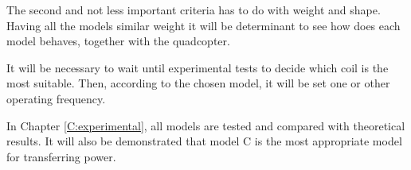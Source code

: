The second and not less important criteria has to do with weight and shape. Having all the models similar weight it will be determinant to see how does each model behaves, together with the quadcopter. 

It will be necessary to wait until experimental tests to decide which coil is the most suitable. Then, according to the chosen model, it will be set one or other operating frequency.

In Chapter \ref{C:experimental}, all models are tested and compared with theoretical results. It will also be demonstrated that model C is the most appropriate model for transferring power. 









 



